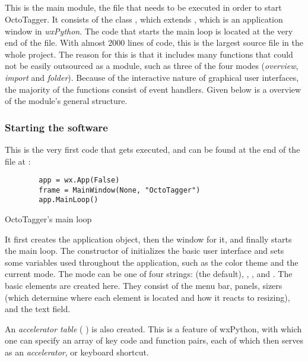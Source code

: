 \subsection{}
\def\kapitelautor{Erik Ritschl}

This is the main module, the file that needs to be executed in order to start OctoTagger. It consists of the class , which extends
 \cite{wxFrame}, which is an application window in \emph{wxPython}.
The code that starts the main loop is located at the very end of the file. 
With almost 2000 lines of code, this is the largest source file in the whole
project. The reason for this is that it includes many functions that could not
be easily outsourced as a module, such as three of the four modes (\emph{overview}, \emph{import} and \emph{folder}). Because of the interactive nature of graphical user interfaces, the majority of the  functions consist of event handlers. Given below is a overview of the
module's general structure.

\subsubsection{Starting the software}

This is the very first code that gets executed, and can be found at the end of the file at :

\begin{listing}[H]
    \begin{verbatim}
        app = wx.App(False)
        frame = MainWindow(None, "OctoTagger")
        app.MainLoop()
    \end{verbatim}
    \caption{OctoTagger's main loop}
\end{listing}

It first creates the application object, then the window for it, and finally starts the main loop. The constructor of  initializes the basic user interface and sets some variables
used throughout the application, such as the color theme and the current mode.
The mode can be one of four strings:  (the default),
, , and . The basic elements are created here. They consist of the menu bar, panels,
sizers (which determine where each element is located and how it reacts to
resizing), and the text field. %

An \emph{accelerator table} ( \cite{wxAccTable}) is also created. This is a feature
of wxPython, with which one can specify an array of key code
and function pairs, each of which then serves as an \emph{accelerator}, or
keyboard shortcut.

